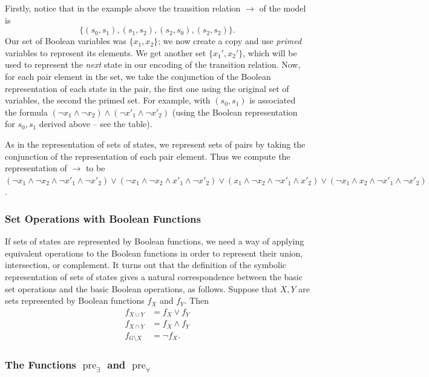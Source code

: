 \documentclass[11pt]{report}
\newcommand{\pre}{\mathop{\mathrm{pre}}}
\begin{document}
Firstly, notice that in the example above the transition relation $\rightarrow$ of the model is $$\{(s_0, s_1), (s_1, s_2), (s_2, s_0), (s_2, s_2)\}.$$
Our set of Boolean variables was $\{x_1, x_2\}$; we now create a copy and use \textit{primed} variables to represent its elements. We get another set $\{x_1', x_2'\}$, which will be used to represent the \textit{next} state in our encoding of the transition relation.
Now, for each pair element in the set, we take the conjunction of the Boolean representation of each state in the pair, the first one using the original set of variables, the second the primed set. For example, with $(s_0, s_1)$ is associated the formula $(\lnot x_1 \land \lnot x_2) \land (\lnot x'_1 \land \lnot x'_2)$ (using the Boolean representation for $s_0, s_1$ derived above -- see the table).

As in the representation of sets of states, we represent sets of pairs by taking the conjunction of the representation of each pair element. Thus we compute the representation of $\rightarrow$ to be $(\lnot x_1 \land \lnot x_2 \land \lnot x'_1 \land \lnot x'_2 ) \lor (\lnot x_1 \land \lnot x_2 \land x'_1 \land \lnot x'_2 ) \lor ( x_1 \land \lnot x_2 \land \lnot x'_1 \land  x'_2 ) \lor (\lnot x_1 \land x_2 \land \lnot x'_1 \land \lnot x'_2 )$.

\subsubsection{Set Operations with Boolean Functions}

If sets of states are represented by Boolean functions, we need a way of applying equivalent operations to the Boolean functions in order to represent their union, intersection, or complement. It turns out that the definition of the symbolic representation of sets of states gives a natural correspondence between the basic set operations and the basic Boolean operations, as follows. 
Suppose that $X, Y$ are sets represented by Boolean functions $f_X$ and $f_Y$. Then
\begin{align*}
f_{X \cup Y} &= f_X \lor f_Y\\
f_{X \cap Y} &= f_X \land f_Y \\
f_{G\setminus X} &= \lnot f_X.
\end{align*}

\subsubsection{The Functions $\pre_\exists$ and $\pre_\forall$}
\end{document}
